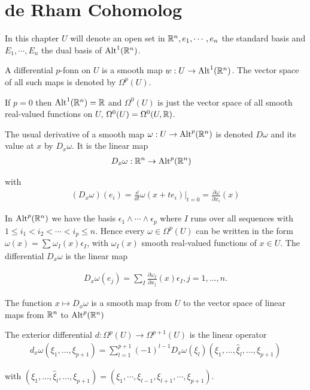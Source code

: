 \chapter{de Rham Cohomolog}
In this chapter $U$ will denote an open set in $\mathbb{R}^n, {e_1,\cdots, e_n}$ the standard basis
and ${E_1, \cdots,E_n}$ the dual basis of $\operatorname{Alt}^1(\mathbb{R}^n)$.

\begin{definition}
  A differential $p$-fonn on $U$ is a smooth map $w:U\to \operatorname{Alt}^1(\mathbb{R}^n)$.
The vector space of all such maps is denoted by $\Omega^p(U)$.
\end{definition}

If $p = 0$ then $\operatorname{Alt}^1(\mathbb{R}^n) = \mathbb{R}$ and $\Omega^0(U)$ is just the vector space of all smooth
real-valued functions on $U$, $\Omega^0(U) = \Omega^0(U, \mathbb{R})$.

The usual derivative of a smooth map $\omega:U\to\operatorname{Alt}^p(\mathbb{R}^n)$ is denoted $D\omega$ and its
value at $x$ by $D_x\omega$. It is the linear map
\begin{align*}
  D_x\omega:\mathbb{R}^n &\to \operatorname{Alt}^p(\mathbb{R}^n)
\end{align*}

with 
\begin{align*}
  (D_x\omega)(e_i) 
  = \frac{\dd }{\dd t}\omega(x+te_i)\Big|_{t=0}
  = \frac{\partial \omega}{\partial x_i}(x)
\end{align*}

In $\operatorname{Alt}^p(\mathbb{R}^n)$ we have the basis $\epsilon_1\wedge\cdots\wedge\epsilon_p$ where 
$I$ runs over all sequences with $1\le i_1<i_2<\cdots<i_p\le n$. Hence every $\omega\in\Omega^p(U)$ 
can be written in the form $\omega(x) = \sum_{}^{}{\omega_I(x)\epsilon_I}$, with $\omega_I(x)$ smooth 
real-valued functions of $x\in U$. The differential $D_x\omega$ is the linear map

\begin{align}\label{eq:3-1}
  D_{x}\omega(e_{j})=\sum_{I}\frac{\partial\omega_{I}}{\partial x_{j}}(x)\epsilon_{I} , j=1,\ldots,n.
\end{align}

The function $x\mapsto D_x\omega$ is a smooth map from $U$ to the vector space of linear
maps from $\mathbb{R}^n$ to $\operatorname{Alt}^p(\mathbb{R}^n)$


\begin{definition}\label{def:3-2}
  The exterior differential $d:\Omega^p(U)\to \Omega^{p+1}(U)$ is the linear operator
  \begin{align*}
    d_x\omega(\xi_1,\ldots,\xi_{p+1})
    = \sum_{l=1}^{p+1}\left(-1\right)^{l-1}D_x\omega(\xi_l)(\xi_1,\ldots,\hat{\xi}_l,\ldots,\xi_{p+1})
  \end{align*}

  with $(\xi_1,\ldots,\hat{\xi}_l,\ldots,\xi_{p+1}) = (\xi_1, \cdots, \xi_{l-1}, \xi_{l+1}, \cdots, \xi_{p+1})$.
\end{definition}


